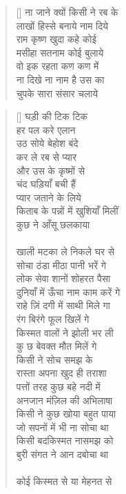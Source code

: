 \begin{verse}[\versewidth]\texthindi{
ना जाने क्यों किसी ने रब के\\
लाखों हिस्से बनाये नाम दिये\\
राम कृष्ण खुदा कहे कोई\\
मसीहा सतनाम कोई बुलाये\\
वो इक रहता कण कण में\\
ना दिखे ना नाम है उस का\\
चुपके सारा संसार चलाये
}\end{verse}

\begin{verse}[\versewidth]\texthindi{
घड़ी की टिक टिक\\
हर पल करे एलान\\
उठ सोये बेहोश बंदे\\
कर ले रब से प्यार\\
और उस के कृष्मों से\\
चंद घड़ियाँ बची हैं\\
प्यार जताने के लिये\\
किताब के पन्नों में खुशियाँ मिलीं\\
कुछ ने आँसू छलकाया\\
\\
खाली मटका ले निकले घर से\\
सोचा ठंडा मीठा पानी भरें गे\\
लोक सेवा शानों शोहरत पैसा\\
दुनियाँ में ऊँचा नाम काम करें गे\\
राहे ज़िं दगी में साथी मिले गा\\
रंग बिरंगे फूल खिलें गे\\
किस्मत वालों ने झोली भर ली\\
कु छ बेवक्त मौत मिलें गे\\
किसी ने सोच समझ के\\
रास्ता अपना खुद ही तराशा\\
पत्तों तरह कुछ बहे नदी में\\
अनजान मंज़िल की अभिलाषा\\
किसी ने कुछ खोया बहुत पाया\\
जो सपनों में भी ना सोचा था\\
किसी बदकिस्मत नासमझ को\\
बुरी संगत ने आन दबोचा था\\
\\
कोई किस्मत से या मेहनत से\\
}
\end{verse}
